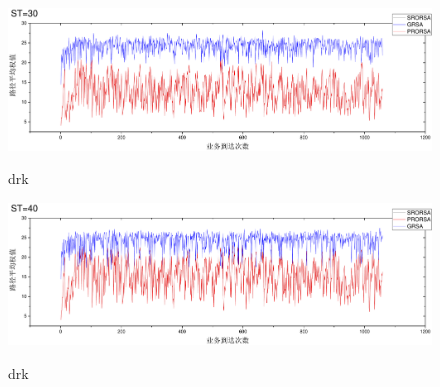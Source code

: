 \begin{figure}
\setlength{\belowcaptionskip}{-0.5cm}
  \begin{center}
    {\includegraphics[width=1 \textwidth]{figures/H30C.pdf}}
    \end{center}
  \caption{{\footnotesize{drk}}}
  \label{drk}
\end{figure}
\begin{figure}
\setlength{\belowcaptionskip}{-0.5cm}
  \begin{center}
    {\includegraphics[width=1 \textwidth]{figures/H40C.pdf}}
    \end{center}
  \caption{{\footnotesize{drk}}}
  \label{drk}
\end{figure}

